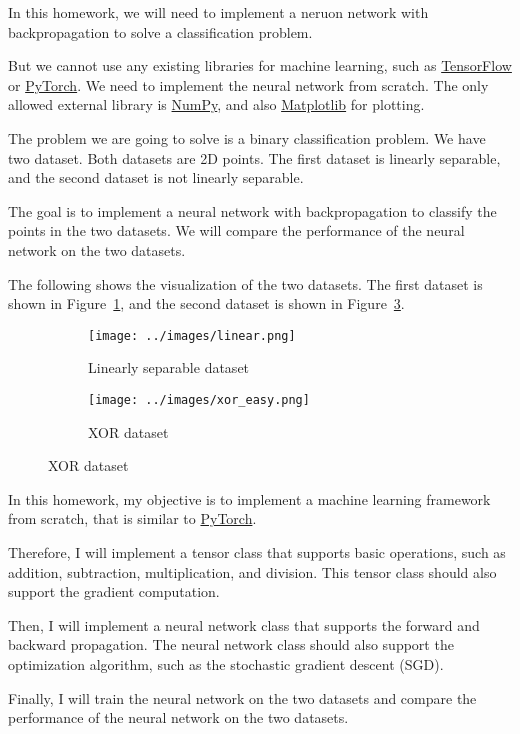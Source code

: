 In this homework, we will need to implement a neruon network with backpropagation to solve a classification problem.

But we cannot use any existing libraries for machine learning, such as \href{https://www.tensorflow.org/}{TensorFlow} or \href{https://pytorch.org/}{PyTorch}. We need to implement the neural network from scratch. The only allowed external library is \href{https://numpy.org/}{NumPy}, and also \href{https://matplotlib.org/}{Matplotlib} for plotting.

The problem we are going to solve is a binary classification problem. We have two dataset. Both datasets are 2D points. The first dataset is linearly separable, and the second dataset is not linearly separable.

The goal is to implement a neural network with backpropagation to classify the points in the two datasets. We will compare the performance of the neural network on the two datasets.

The following shows the visualization of the two datasets. The first dataset is shown in Figure~\ref{fig:dataset1}, and the second dataset is shown in Figure~\ref{fig:dataset2}.

\begin{figure}[H]
    \centering
    \begin{subfigure}[b]{0.45\textwidth}
        \centering
        \texttt{[image: ../images/linear.png]}
        \caption{Linearly separable dataset}
        \label{fig:dataset1}
    \end{subfigure}
    \begin{subfigure}[b]{0.45\textwidth}
        \centering
        \texttt{[image: ../images/xor\_easy.png]}
        \caption{XOR dataset}
        \label{fig:dataset2}
    \end{subfigure}
\end{figure}


In this homework, my objective is to implement a machine learning framework from scratch, that is similar to \href{https://pytorch.org/}{PyTorch}.

Therefore, I will implement a tensor class that supports basic operations, such as addition, subtraction, multiplication, and division. This tensor class should also support the gradient computation.

Then, I will implement a neural network class that supports the forward and backward propagation. The neural network class should also support the optimization algorithm, such as the stochastic gradient descent (SGD).

Finally, I will train the neural network on the two datasets and compare the performance of the neural network on the two datasets.
